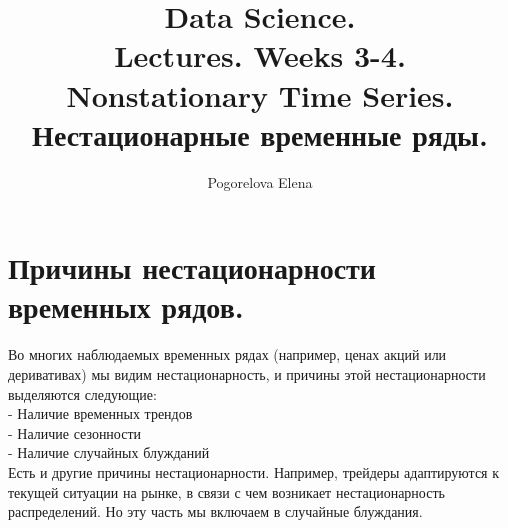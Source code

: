 \documentclass{article}
\title{Data Science.\\
Lectures. Weeks 3-4. \\
Nonstationary Time Series. 
\\ Нестационарные временные ряды.}
\author{Pogorelova Elena}
\begin{document}
\maketitle

\setcounter{tocdepth}{2} %
\renewcommand\contentsname{Contents}
\tableofcontents
\newpage




\renewcommand{\labelitemi}{\tiny$\bullet$}
\renewcommand{\figurename}{Fig.}

 \section{Причины нестационарности временных рядов.}
 \begin{itemize}
     Во многих наблюдаемых временных рядах (например, ценах акций или деривативах) мы видим нестационарность, и причины этой нестационарности выделяются следующие:
     \\ - Наличие временных трендов
     \\ - Наличие сезонности
     \\ - Наличие случайных блужданий
     \\Есть и другие причины нестационарности. Например, трейдеры адаптируются к текущей ситуации на рынке, в связи с чем возникает нестационарность распределений. Но эту часть мы включаем в случайные блуждания.
 \end{itemize}
\end{document}
